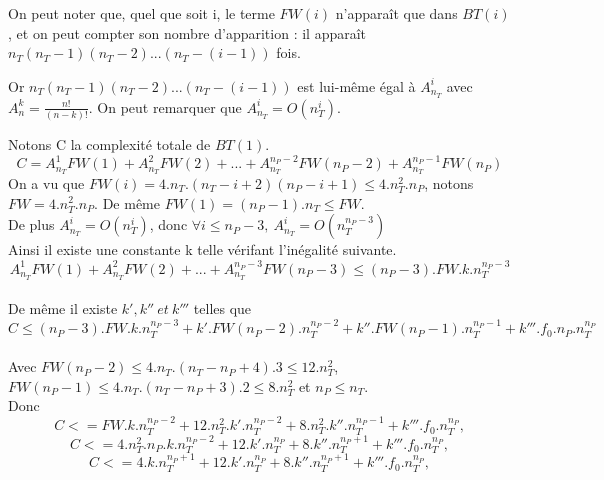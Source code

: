 \begin{pr}
On peut noter que, quel que soit i, le terme $FW(i)$ n'apparaît que dans $BT(i)$, et on peut compter son
nombre d'apparition : il apparaît $n_T(n_T-1)(n_T-2)...(n_T-(i-1))$ fois.

Or $n_T(n_T-1)(n_T-2)...(n_T-(i-1))$ est lui-même égal à $A^{i}_{n_T}$ avec
$A^k_n = \frac{n!}{(n-k)!}$.
On peut remarquer que $A^{i}_{n_T}=O(n_T^i)$.

Notons C la complexité totale de $BT(1)$.
$$C=A^{1}_{n_T}FW(1)+A^{2}_{n_T}FW(2)+...+A^{n_P-2}_{n_T}FW(n_P-2)+A^{n_P-1}_{n_T}FW(n_P)$$
On a vu que $FW(i)=4.n_T.(n_T-i+2)(n_P-i+1)\leq 4.n_T^2.n_P$, notons $FW=4.n_T^2.n_P$. De même $FW(1)=(n_P-1).n_T\leq FW$.
\\
De plus $A^{i}_{n_T}=O(n_T^i)$, donc $\forall i\le n_P-3,\ A^{i}_{n_T}=O(n_T^{n_P-3})$\\
Ainsi il existe une constante k telle vérifant l'inégalité suivante.
$$A^{1}_{n_T}FW(1)+A^{2}_{n_T}FW(2)+...+A^{n_P-3}_{n_T}FW(n_P-3)\le(n_P-3).FW.k.n_T^{n_P-3}$$
\\
De même il existe $k', k''\ et\ k'''$ telles que $$C\le(n_P-3).FW.k.n_T^{n_P-3}+k'.FW(n_P-2).n_T^{n_P-2}+k''.FW(n_P-1).n_T^{n_P-1}+k'''.f_0.n_P.n_T^{n_P}$$
\\
Avec $FW(n_P-2)\le 4.n_T.(n_T-n_P+4).3\le 12.n_T^2$, $FW(n_P-1)\le 4.n_T.(n_T-n_P+3).2\le 8.n_T^2$ et $n_P\le n_T$.
\\
Donc $$C<=FW.k.n_T^{n_P-2}+12.n_T^2.k'.n_T^{n_P-2}+8.n_T^2.k''.n_T^{n_P-1}+k'''.f_0.n_T^{n_P},$$
$$C<=4.n_T^2.n_P.k.n_T^{n_P-2}+12.k'.n_T^{n_P}+8.k''.n_T^{n_P+1}+k'''.f_0.n_T^{n_P},$$
$$C<=4.k.n_T^{n_P+1}+12.k'.n_T^{n_P}+8.k''.n_T^{n_P+1}+k'''.f_0.n_T^{n_P},$$

% 


\end{pr}
